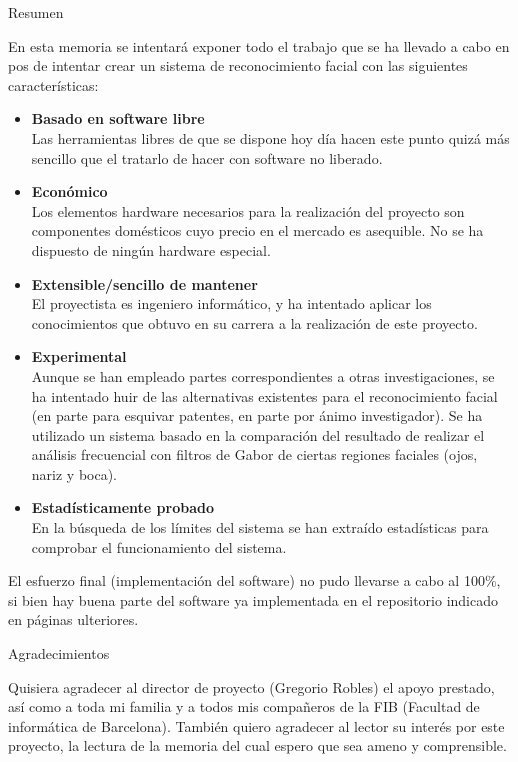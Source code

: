 \begin{center}
\Huge{Resumen}\\[2cm]
\end{center}

En esta memoria se intentará exponer todo el trabajo que se ha llevado a cabo en pos de intentar crear un sistema de reconocimiento facial con las siguientes características:
\begin{itemize}
	\item{\textbf{Basado en software libre}\\
	Las herramientas libres de que se dispone hoy día hacen este punto quizá más sencillo que el tratarlo de hacer con software no liberado.}
	\item{\textbf{Económico}\\
	Los elementos hardware necesarios para la realización del proyecto son componentes domésticos cuyo precio en el mercado es asequible. No se ha dispuesto de ningún hardware especial. }
	\item{\textbf{Extensible/sencillo de mantener}\\
	El proyectista es ingeniero informático, y ha intentado aplicar los conocimientos que obtuvo en su carrera a la realización de este proyecto.}
	\item{\textbf{Experimental}\\
	Aunque se han empleado partes correspondientes a otras investigaciones, se ha intentado huir de las alternativas existentes para el reconocimiento facial (en parte para esquivar patentes, en parte por ánimo investigador). Se ha utilizado un sistema basado en la comparación del resultado de realizar el análisis frecuencial con filtros de Gabor de ciertas regiones faciales (ojos, nariz y boca).}
	\item{\textbf{Estadísticamente probado}\\
	En la búsqueda de los límites del sistema se han extraído estadísticas para comprobar el funcionamiento del sistema.}
\end{itemize}
El esfuerzo final (implementación del software) no pudo llevarse a cabo al 100\%, si bien hay buena parte del software ya implementada en el repositorio indicado en páginas ulteriores.\\[2cm]

\begin{center}
\Large{Agradecimientos}
\end{center}

Quisiera agradecer al director de proyecto (Gregorio Robles) el apoyo prestado, así como a toda mi familia y a todos mis compañeros de la FIB (Facultad de informática de Barcelona). También quiero agradecer al lector su interés por este proyecto, la lectura de la memoria del cual espero que sea ameno y comprensible. \\

